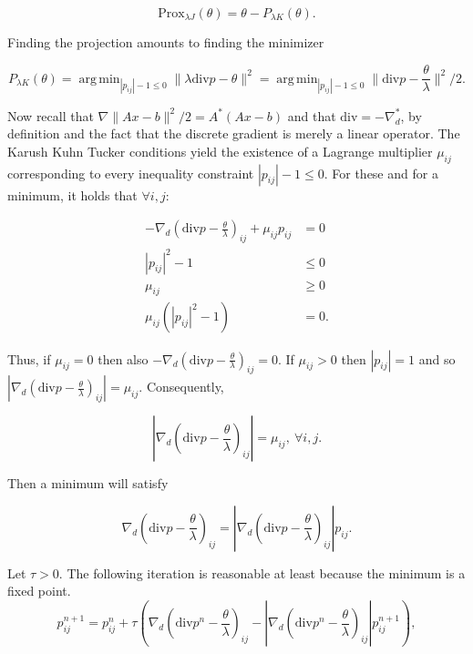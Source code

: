 \documentclass[paper=a4, fontsize=11pt]{scrartcl} %
\DeclareMathOperator*{\argmin}{arg\,min}
\numberwithin{equation}{section} %
\numberwithin{figure}{section} %
\numberwithin{table}{section} %
\newcommand{\prox}{\text{Prox}}
\newcommand{\grad}{\nabla_{d} }
\newcommand{\divg}{\text{div}}
\begin{document}
\begin{equation*}
  \prox_{\lambda J}(\theta) = \theta - P_{\lambda K}( \theta ).
\end{equation*}

Finding the projection amounts to finding the minimizer

\begin{equation*}
P_{\lambda K}(\theta) = \argmin_{|p_{ij}| - 1 \leq 0} \|\lambda \divg
p - \theta \|^2 = \argmin_{|p_{ij}| - 1 \leq 0} \| \divg p -
\frac{\theta}{\lambda} \|^2 / 2.
\end{equation*}

Now recall that $\nabla \|Ax - b \|^2/2 = A^*(Ax-b)$ and that $\divg =
-\grad^{*}$, by definition and the fact that the discrete gradient is
merely a linear operator. The Karush Kuhn Tucker conditions yield the
existence of a Lagrange multiplier $\mu_{ij}$ corresponding to every
inequality constraint $|p_{ij}| - 1 \leq 0$. For these and for a
minimum, it holds that $\forall i,j$:

\begin{align*}
  -\grad( \divg p - \frac{\theta}{\lambda} )_{ij} +  \mu_{ij} p_{ij} &= 0 \\
  |p_{ij}|^2 - 1 & \leq 0 \\ 
  \mu_{ij} &\geq 0 \\
  \mu_{ij}( |p_{ij}|^2 - 1 ) &= 0.
\end{align*}

Thus, if $\mu_{ij} = 0$ then also $-\grad(  \divg p -\frac{\theta}{\lambda} )_{ij} = 0$.
If $\mu_{ij} > 0$ then $|p_{ij}| = 1$ and so $|\grad( \divg p - \frac{\theta}{\lambda} )_{ij}| = \mu_{ij}$.
Consequently,

\begin{equation*}
  |\grad(\divg p - \frac{\theta}{\lambda} )_{ij}| =  \mu_{ij}, \ \forall i,j.
\end{equation*}

Then a minimum will satisfy

\begin{equation*}
  \grad( \divg p - \frac{\theta}{\lambda} )_{ij} = |\grad( \divg p - \frac{\theta}{\lambda} )_{ij}|  p_{ij}.
\end{equation*}

Let $\tau > 0$. The following iteration is reasonable at least because
the minimum is a fixed point.
\begin{equation}
  p_{ij}^{n+1} = p_{ij}^{n} + \tau \left ( \grad (\divg p^{n} -
    \frac{\theta}{\lambda})_{ij} - | \grad (\divg p^{n} -
    \frac{\theta}{\lambda})_{ij}|p_{ij}^{n+1} \right ),
\end{equation}
\end{document}
